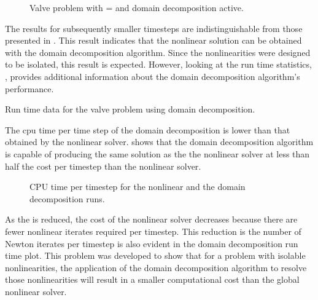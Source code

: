 \begin{figure}[h!t]
\centering

\caption{Valve problem with \dtmax{} =  and domain decomposition active.}
\label{fig:valveDom6pt25em02}
\end{figure}

The results for subsequently smaller timesteps are indistinguishable from those presented in .
This result indicates that the nonlinear solution can be obtained with the domain decomposition algorithm.
Since the nonlinearities were designed to be isolated, this result is expected.
However, looking at the run time statistics, , provides additional information about the domain decomposition algorithm's performance.

\begin{table}[h!t]
\centering
\singlespace

\caption{Run time data for the valve problem using domain decomposition.}
\label{tab:valveDomTable}
\end{table}

The cpu time per time step of the domain decomposition is lower than that obtained by the nonlinear solver.
 shows that the domain decomposition algorithm is capable of producing the same solution as the the nonlinear solver at less than half the cost per timestep than the nonlinear solver.

\begin{figure}[h!t]
\centering

\caption{CPU time per timestep for the nonlinear and the domain decomposition runs.}
\label{fig:valveRunTime}
\end{figure}

As the \dtmax{} is reduced, the cost of the nonlinear solver decreases because there are fewer nonlinear iterates required per timestep.
This reduction is the number of Newton iterates per timestep is also evident in the domain decomposition run time plot.
This problem was developed to show that for a problem with isolable nonlinearities, the application of the domain decomposition algorithm to resolve those nonlinearities will result in a smaller computational cost than the global nonlinear solver.


